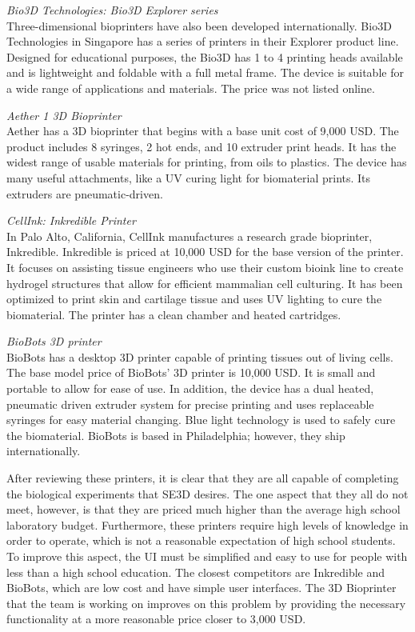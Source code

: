 \textit{Bio3D Technologies: Bio3D Explorer series}\\
Three-dimensional bioprinters have also been developed internationally. Bio3D Technologies in Singapore has a series of printers in their Explorer product line. Designed for educational purposes, the Bio3D has 1 to 4 printing heads available and is lightweight and foldable with a full metal frame. The device is suitable for a wide range of applications and materials. The price was not listed online.

\textit{Aether 1 3D Bioprinter} \\
Aether has a 3D bioprinter that begins with a base unit cost of 9,000 USD. The product includes 8 syringes, 2 hot ends, and 10 extruder print heads. It has the widest range of usable materials for printing, from oils to plastics. The device has many useful attachments, like a UV curing light for biomaterial prints. Its extruders are pneumatic-driven.

\textit{CellInk: Inkredible Printer} \\
In Palo Alto, California, CellInk manufactures a research grade bioprinter, Inkredible. Inkredible is priced at 10,000 USD for the base version of the printer. It focuses on assisting tissue engineers who use their custom bioink line to create hydrogel structures that allow for efficient mammalian cell culturing. It has been optimized to print skin and cartilage tissue and uses UV lighting to cure the biomaterial. The printer has a clean chamber and heated cartridges.

\textit{BioBots 3D printer} \\
BioBots has a desktop 3D printer capable of printing tissues out of living cells. The base model price of BioBots’ 3D printer is 10,000 USD. It is small and portable to allow for ease of use. In addition, the device has a dual heated, pneumatic driven extruder system for precise printing and uses replaceable syringes for easy material changing. Blue light technology is used to safely cure the biomaterial. BioBots is based in Philadelphia; however, they ship internationally.

After reviewing these printers, it is clear that they are all capable of completing the biological experiments that SE3D desires. The one aspect that they all do not meet, however, is that they are priced much higher than the average high school laboratory budget. Furthermore, these printers require high levels of knowledge in order to operate, which is not a reasonable expectation of high school students. To improve this aspect, the UI must be simplified and easy to use for people with less than a high school education. The closest competitors are Inkredible and BioBots, which are low cost and have simple user interfaces. The 3D Bioprinter that the team is working on improves on this problem by providing the necessary functionality at a more reasonable price closer to 3,000 USD. 



